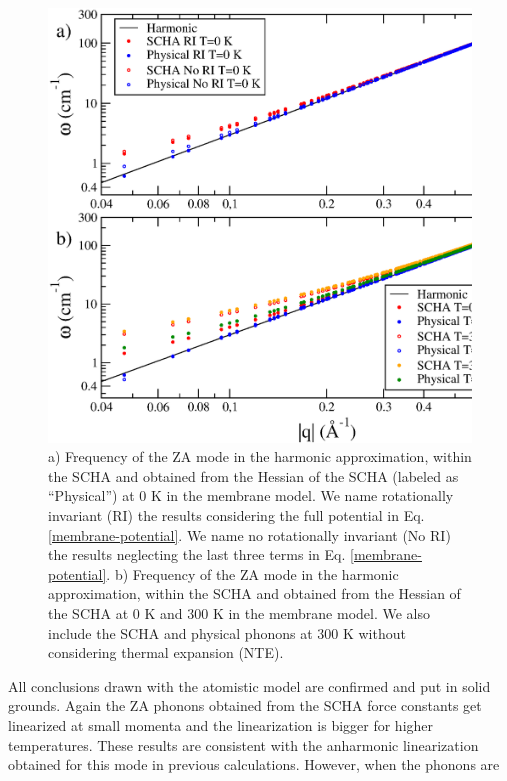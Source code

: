 \begin{figure}[h]
\includegraphics[width=\linewidth]{Figures/membrane.eps}
\caption[ZA harmonic and anharmonic phonons in the membrane model.]{a) Frequency of the ZA mode in the harmonic 
	approximation, within the SCHA and obtained from the Hessian of the SCHA (labeled as ``Physical'') at 0 K in 
	the membrane model. We name rotationally invariant (RI) the results considering the full potential in 
	Eq. \ref{membrane-potential}. We name no rotationally invariant (No RI) the results neglecting the last three 
	terms in Eq. \ref{membrane-potential}. b) Frequency of the ZA mode in the harmonic approximation, within the 
	SCHA and obtained from the Hessian of the SCHA at $0$ K and $300$ K in the membrane model. We also include 
	the SCHA and physical phonons at $300$ K without considering thermal expansion (NTE).}
\label{membrane-results}
\end{figure}
All conclusions drawn with the atomistic model are confirmed and put in solid grounds. Again the ZA phonons obtained 
from the SCHA force constants get linearized at small momenta and the linearization is bigger for higher 
temperatures. These results are consistent with the anharmonic linearization obtained for this mode in previous 
calculations\cite{mariani2008flexural,amorim2014thermodynamics,de2012bending}. However, when the phonons are 
